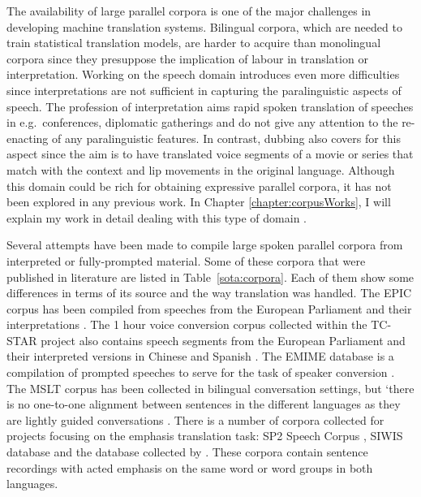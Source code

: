 The availability of large parallel corpora is one of the major challenges in developing machine translation systems. Bilingual corpora, which are needed to train statistical translation models, are harder to acquire than monolingual corpora since they presuppose the implication of labour in translation or interpretation. Working on the speech domain introduces even more difficulties since interpretations are not sufficient in capturing the paralinguistic aspects of speech. The profession of interpretation aims rapid spoken translation of speeches in e.g.~conferences, diplomatic gatherings and do not give any attention to the re-enacting of any paralinguistic features. In contrast, dubbing also covers for this aspect since the aim is to have translated voice segments of a movie or series that match with the context and lip movements in the original language. Although this domain could be rich for obtaining expressive parallel corpora, it has not been explored in any previous work. In Chapter \ref{chapter:corpusWorks}, I will explain my work in detail dealing with this type of domain \citep{bucc, Oktem2018}.

Several attempts have been made to compile large spoken parallel corpora from interpreted or fully-prompted material. Some of these corpora that were published in literature are listed in Table~\ref{sota:corpora}. Each of them show some differences in terms of its source and the way translation was handled. The EPIC corpus has been compiled from speeches from the European Parliament and their interpretations \citep{bendazzoli2005approach}. The 1 hour voice conversion corpus collected within the TC-STAR project also contains speech segments from the European Parliament and their interpreted versions in Chinese and Spanish \citep{tcstar_corpora}. The EMIME database is a compilation of prompted speeches to serve for the task of speaker conversion \citep{wester2010emime}. The MSLT corpus has been collected in bilingual conversation settings, but `there is no one-to-one alignment between sentences in the different languages as they are lightly guided conversations \citep{federmann2016microsoft}. There is a number of corpora collected for projects focusing on the emphasis translation task: SP2 Speech Corpus \citep{sevcujski2016design}, SIWIS database \citep{siwis_db} and the database collected by \cite{quoc_corpus}. These corpora contain sentence recordings with acted emphasis on the same word or word groups in both languages. 

